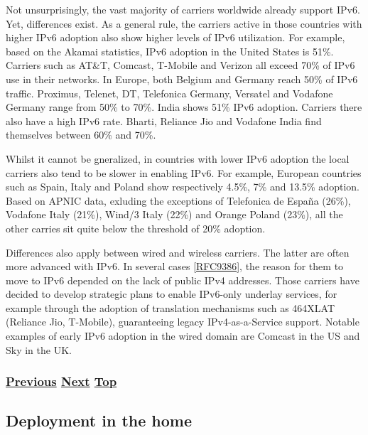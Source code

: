 \documentclass[
]{article}
\begin{document}
Not unsurprisingly, the vast majority of carriers worldwide already
support IPv6. Yet, differences exist. As a general rule, the carriers
active in those countries with higher IPv6 adoption also show higher
levels of IPv6 utilization. For example, based on the Akamai statistics,
IPv6 adoption in the United States is 51\%. Carriers such as AT\&T,
Comcast, T-Mobile and Verizon all exceed 70\% of IPv6 use in their
networks. In Europe, both Belgium and Germany reach 50\% of IPv6
traffic. Proximus, Telenet, DT, Telefonica Germany, Versatel and
Vodafone Germany range from 50\% to 70\%. India shows 51\% IPv6
adoption. Carriers there also have a high IPv6 rate. Bharti, Reliance
Jio and Vodafone India find themselves between 60\% and 70\%.

Whilst it cannot be gneralized, in countries with lower IPv6 adoption
the local carriers also tend to be slower in enabling IPv6. For example,
European countries such as Spain, Italy and Poland show respectively
4.5\%, 7\% and 13.5\% adoption. Based on APNIC data, exluding the
exceptions of Telefonica de España (26\%), Vodafone Italy (21\%), Wind/3
Italy (22\%) and Orange Poland (23\%), all the other carries sit quite
below the threshold of 20\% adoption.

Differences also apply between wired and wireless carriers. The latter
are often more advanced with IPv6. In several cases
{[}\href{https://www.rfc-editor.org/info/rfc9386}{RFC9386}{]}, the
reason for them to move to IPv6 depended on the lack of public IPv4
addresses. Those carriers have decided to develop strategic plans to
enable IPv6-only underlay services, for example through the adoption of
translation mechanisms such as 464XLAT (Reliance Jio, T-Mobile),
guaranteeing legacy IPv4-as-a-Service support. Notable examples of early
IPv6 adoption in the wired domain are Comcast in the US and Sky in the
UK.

\subsubsection{\texorpdfstring{\hyperref[status]{Previous}
\hyperref[deployment-in-the-home]{Next}
\hyperref[deployment-status]{Top}}{Previous Next Top}}\label{previous-next-top-35}

\pagebreak

\subsection{Deployment in the home}\label{deployment-in-the-home}
\end{document}
